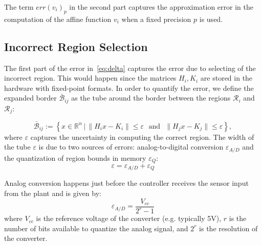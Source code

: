 The term $\mathit{err}(v_{i})_{p}$ in
the second part captures the approximation error in the computation of the affine function $v_{i}$ when a fixed precision $p$ is used.

\subsection{Incorrect Region Selection}

The first part of the error in~\autoref{eq:delta} captures the error due to
selecting of the incorrect region.
This would happen since the matrices $H_i,K_i$ are stored in the hardware with fixed-point formats. In order to quantify the error, we define the expanded border $\bar{\mathcal B}_{ij}$ as the tube around the border between the regions $\mathcal{R}_i$ and $\mathcal{R}_j$:

\begin{equation*}
\bar{\mathcal B}_{ij} := \left\{x\in\mathbb R^n\,|\, \| H_i x - K_i\| \le \varepsilon\,\, \text{ and }\,\, \| H_j x - K_j\| \le \varepsilon \right\},
\end{equation*}
where $\varepsilon$ captures the uncertainty in computing the correct region.
%
The width of the tube $\varepsilon$ is due to two sources of errors:
analog-to-digital conversion $\varepsilon_{A/D}$ and the quantization of region
bounds in memory $\varepsilon_{Q}$:
\begin{equation}\label{eq:epsilontot}
  \varepsilon=\varepsilon_{A/D}+\varepsilon_{Q}
\end{equation}

Analog conversion happens just before the controller receives the sensor input from the plant
and is given by:
\begin{equation*}
\varepsilon_{A/D}=\frac{V_{cc}}{2^{r}-1}
\end{equation*}
where $V_{cc}$ is the reference voltage of the converter (e.g. typically 5V), $r$
is the number of bits available to quantize the analog signal, and $2^{r}$ is
the resolution of the converter.

